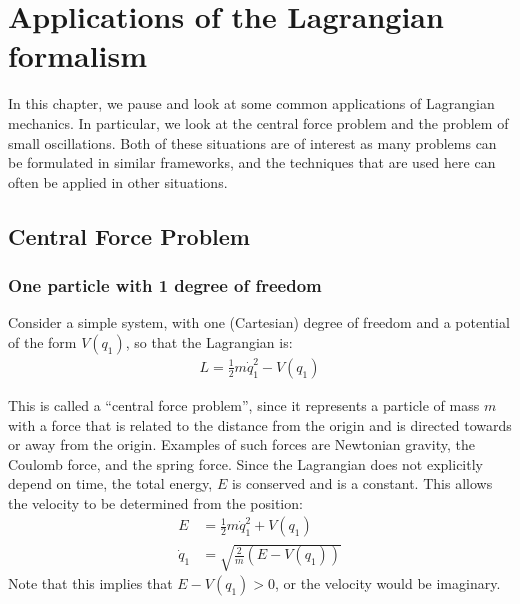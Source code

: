 %
\chapter{Applications of the Lagrangian formalism}
\label{chap:LagrangianApplications}
In this chapter, we pause and look at some common applications of Lagrangian mechanics. In particular, we look at the central force problem and the problem of small oscillations. Both of these situations are of interest as many problems can be formulated in similar frameworks, and the techniques that are used here can often be applied in other situations.

\section{Central Force Problem}
\subsection{One particle with 1 degree of freedom}
Consider a simple system, with one (Cartesian) degree of freedom and a potential of the form $V(q_1)$, so that the Lagrangian is:
\begin{align}
L=\frac{1}{2}m\dot{q}_1^2-V(q_1)
\end{align}

This is called a ``central force problem'', since it represents a particle of mass $m$ with a force that is related to the distance from the origin and is directed towards or away from the origin. Examples of such forces are Newtonian gravity, the Coulomb force, and the spring force. Since the Lagrangian does not explicitly depend on time, the total energy, $E$ is conserved and is a constant. This allows the velocity to be determined from the position:
\begin{align}
E&=\frac{1}{2}m\dot{q}_1^2+V(q_1)\nonumber\\
\dot{q}_1&=\sqrt{\frac{2}{m}(E-V(q_1))}
\label{eqn:consE1dof}
\end{align}
Note that this implies that $E-V(q_1)>0$, or the velocity would be imaginary. 

